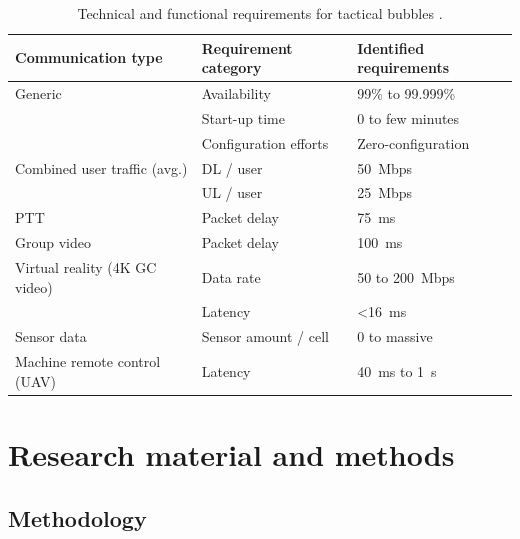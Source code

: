 \documentclass[english, 12pt, a4paper, elec, utf8, a-1b, online]{aaltothesis}
\begin{document}
\begin{table}[h]
  \centering
  \caption{Technical and functional requirements for tactical bubbles \cite{heikkila2021field}.} %
  \begin{tabular}{@{}lll@{}}
  \toprule
  Communication type            & Requirement category  & Identified requirements \\ \midrule
  Generic                       & Availability          & 99\% to 99.999\%        \\
                                & Start-up time         & 0 to few minutes        \\
                                & Configuration efforts & Zero-configuration      \\ \addlinespace[0.5em]
  Combined user traffic (avg.)  & DL / user             & 50~Mbps                 \\
                                & UL / user             & 25~Mbps                 \\ \addlinespace[0.5em]
  PTT                           & Packet delay          & 75~ms                   \\ \addlinespace[0.5em]
  Group video                   & Packet delay          & 100~ms                  \\ \addlinespace[0.5em]
  Virtual reality (4K GC video) & Data rate             & 50 to 200~Mbps          \\
                                & Latency               & \textless 16~ms         \\ \addlinespace[0.5em]
  Sensor data                   & Sensor amount / cell  & 0 to massive            \\ \addlinespace[0.5em]
  Machine remote control (UAV)  & Latency               & 40~ms to 1~s            \\ \bottomrule
  \end{tabular}
  \label{table-mcx-requirements}
\end{table}

\clearpage

\section{Research material and methods}

\subsection{Methodology} %
\end{document}
